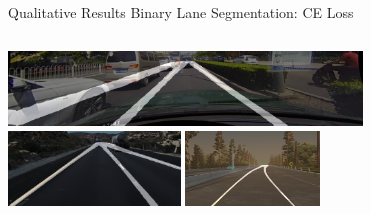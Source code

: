 \documentclass[aspectratio=169]{beamer}
\begin{document}
\begin{frame}{Qualitative Results Binary Lane Segmentation: CE Loss}
\begin{columns}[t]
        \includegraphics[width=\columnwidth,height= 2cm]{images/SCNN_res_culane.png}
        \centering
        \includegraphics[width=\columnwidth,height= 2cm]{images/SCNN_res_tusimple.png}
        \includegraphics[width=\columnwidth,height= 2cm]{images/Resa_r18_sim3d.png}
        \centering
    \end{columns}

\end{frame}


\end{document}
